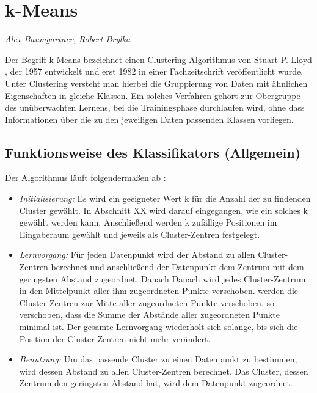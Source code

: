 \section{k-Means}
\textit{Alex Baumgärtner, Robert Brylka}


Der Begriff k-Means bezeichnet einen Clustering-Algorithmus von Stuart P. Lloyd \cite{Lloyd}, der 1957 entwickelt und erst 1982 in einer Fachzeitschrift veröffentlicht wurde. Unter Clustering versteht man hierbei die Gruppierung von Daten mit ähnlichen Eigenschaften in gleiche Klassen. 
Ein solches Verfahren gehört zur Obergruppe des unüberwachten Lernens, bei die Trainingsphase durchlaufen wird, ohne dass Informationen über die zu den jeweiligen Daten passenden Klassen vorliegen.

\subsection{Funktionsweise des Klassifikators (Allgemein)}

Der Algorithmus läuft folgendermaßen ab \cite{Marsland}:
\begin{itemize}

\item \emph{Initialisierung:} Es wird ein geeigneter Wert k für die Anzahl der zu findenden Cluster gewählt. In Abschnitt XX wird darauf eingegangen, wie ein solches k gewählt werden kann. Anschließend werden k zufällige Positionen im Eingaberaum gewählt und jeweils als Cluster-Zentren festgelegt.
\item \emph{Lernvorgang:} Für jeden Datenpunkt wird der Abstand zu allen Cluster-Zentren berechnet und anschließend der Datenpunkt dem Zentrum mit dem geringsten Abstand zugeordnet. Danach 
Danach wird jedes Cluster-Zentrum in den Mittelpunkt aller ihm zugeordneten Punkte verschoben.
werden die Cluster-Zentren 
zur Mitte aller zugeordneten Punkte verschoben.
so verschoben, dass die Summe der Abstände aller zugeordneten Punkte minimal ist. 
Der gesamte Lernvorgang wiederholt sich solange, bis sich die Position der Cluster-Zentren nicht mehr verändert. 
\item \emph{Benutzung:} Um das passende Cluster zu einen Datenpunkt zu bestimmen, wird dessen Abstand zu allen Cluster-Zentren berechnet. Das Cluster, dessen Zentrum den geringsten Abstand hat, wird dem Datenpunkt zugeordnet.
\end{itemize}

